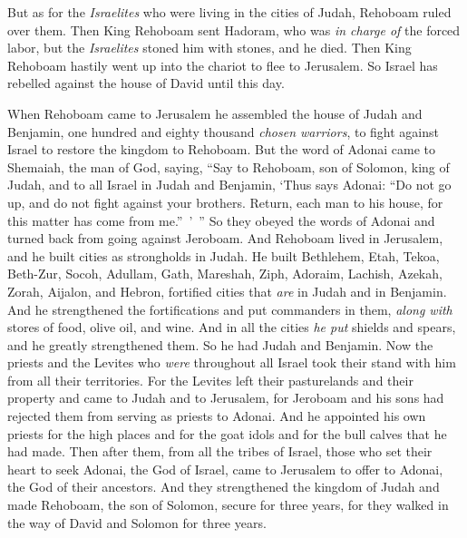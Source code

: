 \begin{biblechapter}
\verse But as for the \textit{Israelites} who were living in the cities of Judah, Rehoboam ruled over them.
\verse Then King Rehoboam sent Hadoram, who was \textit{in charge of} the forced labor, but the \textit{Israelites} stoned him with stones, and he died. Then King Rehoboam hastily went up into the chariot to flee to Jerusalem.
\verse So Israel has rebelled against the house of David until this day.
\end{biblechapter}

\begin{biblechapter} %
 When Rehoboam came to Jerusalem he assembled the house of Judah and Benjamin, one hundred and eighty thousand \textit{chosen warriors}, to fight against Israel to restore the kingdom to Rehoboam.
\verse But the word of Adonai came to Shemaiah, the man of God, saying,
\verse “Say to Rehoboam, son of Solomon, king of Judah, and to all Israel in Judah and Benjamin,
\verse ‘Thus says Adonai: “Do not go up, and do not fight against your brothers. Return, each man to his house, for this matter has come from me.” ’ ” So they obeyed the words of Adonai and turned back from going against Jeroboam.
\verse And Rehoboam lived in Jerusalem, and he built cities as strongholds in Judah.
\verse He built Bethlehem, Etah, Tekoa,
\verse Beth-Zur, Socoh, Adullam,
\verse Gath, Mareshah, Ziph,
\verse Adoraim, Lachish, Azekah,
\verse Zorah, Aijalon, and Hebron, fortified cities that \textit{are} in Judah and in Benjamin.
\verse And he strengthened the fortifications and put commanders in them, \textit{along with} stores of food, olive oil, and wine.
\verse And in all the cities \textit{he put} shields and spears, and he greatly strengthened them. So he had Judah and Benjamin.
 Now the priests and the Levites who \textit{were} throughout all Israel took their stand with him from all their territories.
\verse For the Levites left their pasturelands and their property and came to Judah and to Jerusalem, for Jeroboam and his sons had rejected them from serving as priests to Adonai.
\verse And he appointed his own priests for the high places and for the goat idols and for the bull calves that he had made.
\verse Then after them, from all the tribes of Israel, those who set their heart to seek Adonai, the God of Israel, came to Jerusalem to offer to Adonai, the God of their ancestors.
\verse And they strengthened the kingdom of Judah and made Rehoboam, the son of Solomon, secure for three years, for they walked in the way of David and Solomon for three years.

\end{biblechapter}
